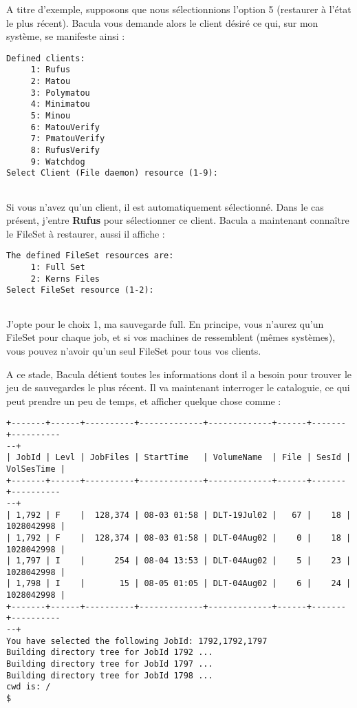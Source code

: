 A titre d'exemple, supposons que nous s\'electionnions l'option 5 (restaurer \`a 
l'\'etat le plus r\'ecent). Bacula vous demande alors le client d\'esir\'e ce qui, 
sur mon syst\`eme, se manifeste ainsi :

\footnotesize
\begin{verbatim}
Defined clients:
     1: Rufus
     2: Matou
     3: Polymatou
     4: Minimatou
     5: Minou
     6: MatouVerify
     7: PmatouVerify
     8: RufusVerify
     9: Watchdog
Select Client (File daemon) resource (1-9):
     
\end{verbatim}
\normalsize

Si vous n'avez qu'un client, il est automatiquement s\'electionn\'e. Dans le cas 
pr\'esent, j'entre {\bf Rufus} pour s\'electionner ce client. Bacula a 
maintenant conna\^itre le FileSet \`a restaurer, aussi il affiche :

\footnotesize
\begin{verbatim}
The defined FileSet resources are:
     1: Full Set
     2: Kerns Files
Select FileSet resource (1-2):
     
\end{verbatim}
\normalsize

J'opte pour le choix 1, ma sauvegarde full. En principe, vous n'aurez qu'un 
FileSet pour chaque job, et si vos machines de ressemblent (m\^emes syst\`emes), 
vous pouvez n'avoir qu'un seul FileSet pour tous vos clients.

A ce stade, Bacula d\'etient toutes les informations dont il a besoin pour 
trouver le jeu de sauvegardes le plus r\'ecent. Il va maintenant interroger le 
cataloguie, ce qui peut prendre un peu de temps, et afficher quelque chose 
comme :

\footnotesize
\begin{verbatim}
+-------+------+----------+-------------+-------------+------+-------+----------
--+
| JobId | Levl | JobFiles | StartTime   | VolumeName  | File | SesId |
VolSesTime |
+-------+------+----------+-------------+-------------+------+-------+----------
--+
| 1,792 | F    |  128,374 | 08-03 01:58 | DLT-19Jul02 |   67 |    18 |
1028042998 |
| 1,792 | F    |  128,374 | 08-03 01:58 | DLT-04Aug02 |    0 |    18 |
1028042998 |
| 1,797 | I    |      254 | 08-04 13:53 | DLT-04Aug02 |    5 |    23 |
1028042998 |
| 1,798 | I    |       15 | 08-05 01:05 | DLT-04Aug02 |    6 |    24 |
1028042998 |
+-------+------+----------+-------------+-------------+------+-------+----------
--+
You have selected the following JobId: 1792,1792,1797
Building directory tree for JobId 1792 ...
Building directory tree for JobId 1797 ...
Building directory tree for JobId 1798 ...
cwd is: /
$
\end{verbatim}
\normalsize

